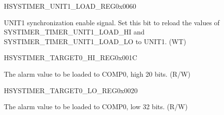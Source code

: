 \begin{register}{H}{SYSTIMER\_UNIT1\_LOAD\_REG}{0x0060}\label{regdesc:SYSTIMERUNIT1LOADREG}
%
%
\regnewline%
\begin{regdesc}\begin{reglist}
\label{fielddesc:SYSTIMERTIMERUNIT1LOAD}\item [SYSTIMER\_TIMER\_UNIT1\_LOAD] UNIT1 synchronization enable signal. Set this bit to reload the values of SYSTIMER\_TIMER\_UNIT1\_LOAD\_HI and SYSTIMER\_TIMER\_UNIT1\_LOAD\_LO to UNIT1. (WT)
\end{reglist}\end{regdesc}
\end{register}


\begin{register}{H}{SYSTIMER\_TARGET0\_HI\_REG}{0x001C}\label{regdesc:SYSTIMERTARGET0HIREG}
%
%
\regnewline%
\begin{regdesc}\begin{reglist}
\label{fielddesc:SYSTIMERTIMERTARGET0HI}\item [SYSTIMER\_TIMER\_TARGET0\_HI] The alarm value to be loaded to COMP0, high 20 bits. (R/W)
\end{reglist}\end{regdesc}
\end{register}


\begin{register}{H}{SYSTIMER\_TARGET0\_LO\_REG}{0x0020}\label{regdesc:SYSTIMERTARGET0LOREG}
%
\regnewline%
\begin{regdesc}\begin{reglist}
\label{fielddesc:SYSTIMERTIMERTARGET0LO}\item [SYSTIMER\_TIMER\_TARGET0\_LO] The alarm value to be loaded to COMP0, low 32 bits. (R/W)
\end{reglist}\end{regdesc}
\end{register}


